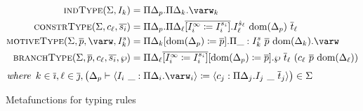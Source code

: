 \begin{figure}
\centering

\begin{align*}
    \indtype{\Sigma}{I_k} &=
        \Pi \Delta_p . \Pi \Delta_k . \varw_k \\
    \constrtype{\Sigma}{c_\ell}{\overline{s_i}} &=
        \Pi \Delta_p . \Pi \Delta_\ell \overline{[I_i^\infty \coloneqq I_i^{s_i}]} . I_{\ell}^{\hat{s}_{\ell}}\ \dom{\Delta_p}\ \overline{t}_\ell \\
    \motivetype{\Sigma}{\overline{p}}{\varw}{I_k^s} &=
        \Pi \Delta_k[\dom{\Delta_p} \coloneqq \overline{p}] . \Pi \_ : I_k^s\ \overline{p}\ \dom{\Delta_k} . \varw \\
    \branchtype{\Sigma}{\overline{p}}{c_\ell}{\overline{s_i}}{\wp} &=
        \Pi \Delta_\ell \overline{[I_i^\infty \coloneqq I_i^{s_i}]}[\dom{\Delta_p} \coloneqq \overline{p}] . \wp\ \overline{t}_\ell\ (c_\ell\ \overline{p}\ \dom{\Delta_\ell})
\end{align*}
\begin{displaymath}
    \textit{where}\;\:
    k \in \overline{\imath}, \ell \in \overline{\jmath},
    \big(\Delta_p \vdash \langle I_i\ \_ : \Pi\Delta_i . \varw_i \rangle \coloneqq \langle c_j : \Pi \Delta_j . I_j\ \_\ \overline{t}_j \rangle \big) \in \Sigma
\end{displaymath}

\caption{Metafunctions for typing rules}
\label{fig:metafunctions}
\end{figure}